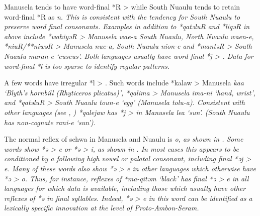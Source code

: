 Manusela tends to have word-final *R > {\0} while South Nuaulu
tends to retain word-final *R as \it{n}.
This is consistent with the tendency for South Nuaulu to preserve word final consonants.
Examples in addition to *qatəluR
and *liqəR in  above  include *wahiyəR > Manusela \it{wae-a}
South Nuaulu, North Nuaulu \it{waen-e}, *niuR/**niwəR > Manusela \it{nue-a},
South Nuaulu \it{nion-e} and *mantəR > South Nuaulu \it{maran-e} ‘cuscus’.
Both languages usually have word final *j > {\0}.
Data for word-final *l is too sparse to identify regular patterns.

A few words have irregular *l > {\0}.
Such words include *kalaw > Manusela \it{kaa} ‘Blyth’s hornbill
(Rhyticeros plicatus)’, *qalima > Manusela \it{ima-ni} ‘hand,
wrist’, and *qatəluR > South Nuaulu \it{toun-e} ‘egg’ (Manusela \it{tolu-a}).
Consistent with other  languages (see ,
) *qalejaw  has *j > {\0} in Manusela \it{lea} ‘sun’.
(South Nuaulu has non-cognate \it{rani-e} ‘sun’).

The normal reflex of schwa in Manusela
and Nuaulu is \it{o},
as shown in .
Some words show *ə > \it{e} or *ə > \it{i},
as shown in .
In most cases this appears to be conditioned by a following high
vowel or palatal consonant,
including final *əj > \it{e}.
Many of these words also show *ə > e in other 
languages which otherwise have *ə > \it{o}.
Thus, for instance, reflexes of *ma-qitəm ‘black’ has final *ə
> \it{e} in all  languages for which data is
available, including those which usually have other reflexes of *ə in final syllables.
Indeed, *ə > \it{e} in this word can be identified as a lexically
specific innovation at the level of Proto-Ambon-Seram.

